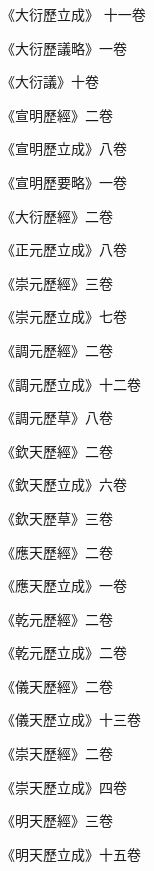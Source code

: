 \begin{pinyinscope}
 《大衍歷立成》
 十一卷



 《大衍歷議略》一卷



 《大衍議》十卷



 《宣明歷經》二卷



 《宣明歷立成》八卷



 《宣明歷要略》一卷



 《大衍歷經》二卷



 《正元歷立成》八卷



 《崇元歷經》三卷



 《崇元歷立成》七卷



 《調元歷經》二卷



 《調元歷立成》十二卷



 《調元歷草》八卷



 《欽天歷經》二卷



 《欽天歷立成》六卷



 《欽天歷草》三卷



 《應天歷經》二卷



 《應天歷立成》一卷



 《乾元歷經》二卷



 《乾元歷立成》二卷



 《儀天歷經》二卷



 《儀天歷立成》十三卷



 《崇天歷經》二卷



 《崇天歷立成》四卷



 《明天歷經》三卷



 《明天歷立成》十五卷




\end{pinyinscope}
